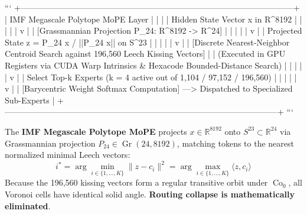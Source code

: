\documentclass[11pt,twoside,openright]{amsbook}
\begin{document}
```
+---------------------------------------------------------------------------------------------------+
|                                 IMF Megascale Polytope MoPE Layer                                 |
|                                                                                                   |
|   Hidden State Vector x in R^8192                                                                 |
|         |                                                                                         |
|         v                                                                                         |
|   [Grassmannian Projection P_24: R^8192 -> R^24]                                                  |
|         |                                                                                         |
|         v                                                                                         |
|   Projected State z = P_24 x / ||P_24 x||  on S^23                                                |
|         |                                                                                         |
|         v                                                                                         |
|   [Discrete Nearest-Neighbor Centroid Search against 196,560 Leech Kissing Vectors]               |
|   (Executed in GPU Registers via CUDA Warp Intrinsics & Hexacode Bounded-Distance Search)         |
|         |                                                                                         |
|         v                                                                                         |
|   Select Top-k Experts (k = 4 active out of 1,104 / 97,152 / 196,560)                            |
|         |                                                                                         |
|         v                                                                                         |
|   [Barycentric Weight Softmax Computation] ---> Dispatched to Specialized Sub-Experts             |
+---------------------------------------------------------------------------------------------------+
```

The \textbf{IMF Megascale Polytope MoPE} projects $x \in \mathbb{R}^{8192}$ onto $S^{23} \subset \mathbb{R}^{24}$ via Grassmannian projection $P_{24} \in \operatorname{Gr}(24, 8192)$, matching tokens to the nearest normalized minimal Leech vectors:
$$i^* = \arg\min_{i \in \{1, \dots, K\}} \|z - c_i\|^2 = \arg\max_{i \in \{1, \dots, K\}} \langle z, c_i \rangle$$
Because the 196,560 kissing vectors form a regular transitive orbit under $\operatorname{Co}_0$, all Voronoi cells have identical solid angle. \textbf{Routing collapse is mathematically eliminated}.
\end{document}
